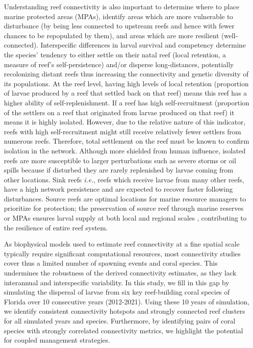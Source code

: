 \documentclass[preprint,12pt,authoryear]{elsarticle}
\begin{document}
	Understanding reef connectivity is also important to determine where to place marine protected areas (MPAs), identify areas which are more vulnerable to disturbance (by being less connected to upstream reefs and hence with fewer chances to be repopulated by them), and areas which are more resilient (well-connected). Interspecific differences in larval survival and competency determine the species’ tendency to either settle on their natal reef (local retention, a measure of reef’s self-persistence) and/or disperse long-distances, potentially recolonizing distant reefs thus increasing the connectivity and genetic diversity of its populations. At the reef level, having high levels of local retention (proportion of larvae produced by a reef that settled back on that reef) means this reef has a higher ability of self-replenishment. If a reef has high self-recruitment (proportion of the settlers on a reef that originated from larvae produced on that reef) it means it is highly isolated. However, due to the relative nature of this indicator, reefs with high self-recruitment might still receive relatively fewer settlers from numerous reefs. Therefore, total settlement on the reef must be known to confirm isolation in the network.  Although more shielded from human influence, isolated reefs are more susceptible to larger perturbations such as severe storms or oil spills \citep{baumann2022remoteness} because if disturbed they are rarely replenished by larvae coming from other locations. Sink reefs \textit{i.e.}, reefs which receive larvae from many other reefs, have a high network persistence and are expected to recover faster following disturbances. Source reefs are optimal locations for marine resource managers to prioritize for protection; the preservation of source reef through marine reserves or MPAs ensures larval supply at both local and regional scales \citep{muenzel2023integrating}, contributing to the resilience of entire reef system.
	
	As biophysical models used to estimate reef connectivity at a fine spatial scale typically require significant computational resources, most connectivity studies cover thus a limited number of spawning events and coral species. This undermines the robustness of the derived connectivity estimates, as they lack interannual and interspecific variability. In this study, we fill in this gap by simulating the dispersal of larvae from six key reef-building coral species of Florida over 10 consecutive years (2012-2021). Using these 10 years of simulation, we identify consistent connectivity hotspots and strongly connected reef clusters for all simulated years and species. Furthermore, by identifying pairs of coral species with strongly correlated connectivity metrics, we highlight the potential for coupled management strategies.
	
\end{document}
